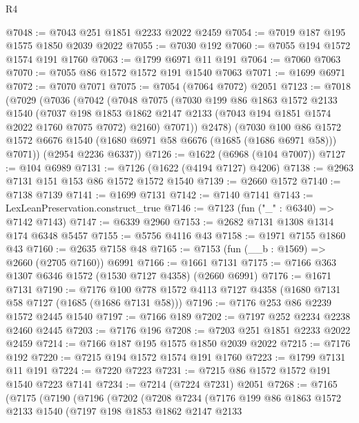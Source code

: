 \begin{lexlean}{R4}
\begin{coremodule}
@7048 := @7043 @251 @1851 @2233 @2022 @2459
@7054 := @7019 @187 @195 @1575 @1850 @2039 @2022
@7055 := @7030 @192
@7060 := @7055 @194 @1572 @1574 @191 @1760
@7063 := @1799 @6971 @11 @191
@7064 := @7060 @7063
@7070 := @7055 @86 @1572 @1572 @191 @1540 @7063
@7071 := @1699 @6971
@7072 := @7070 @7071
@7075 := @7054 (@7064 @7072) @2051
@7123 := @7018
    (@7029
      (@7036
        (@7042
          (@7048
            @7075
            (@7030
              @199
              @86
              @1863
              @1572
              @2133
              @1540
              (@7037
                @198
                @1853
                @1862
                @2147
                @2133
                (@7043 @194 @1851 @1574 @2022 @1760 @7075 @7072)
                @2160)
              @7071))
          @2478)
        (@7030
          @100
          @86
          @1572
          @1572
          @6676
          @1540
          (@1680 @6971 @58 @6676 (@1685 (@1686 @6971 @58)))
          @7071))
      (@2954 @2236 @6337))
@7126 := @1622 (@6968 (@104 @7007))
@7127 := @104 @6989
@7131 := @7126 (@1622 (@4194 @7127) @4206)
@7138 := @2963 @7131 @151 @153 @86 @1572 @1572 @1540
@7139 := @2660 @1572
@7140 := @7138 @7139
@7141 := @1699 @7131
@7142 := @7140 @7141
@7143 := LexLeanPreservation.construct_true
@7146 := @7123 (fun ("_" : @6340) => @7142 @7143)
@7147 := @6339 @2960
@7153 := @2682 @7131 @1308 @1314 @174 @6348 @5457
@7155 := @5756 @4116 @43
@7158 := @1971 @7155 @1860 @43
@7160 := @2635 @7158 @48
@7165 := @7153 (fun (__b : @1569) => @2660 (@2705 @7160)) @6991
@7166 := @1661 @7131
@7175 := @7166 @363 @1307 @6346 @1572 (@1530 @7127 @4358) (@2660 @6991)
@7176 := @1671 @7131
@7190 := @7176 @100 @778 @1572 @4113 @7127 @4358 (@1680 @7131 @58 @7127 (@1685 (@1686 @7131 @58)))
@7196 := @7176 @253 @86 @2239 @1572 @2445 @1540
@7197 := @7166 @189
@7202 := @7197 @252 @2234 @2238 @2460 @2445
@7203 := @7176 @196
@7208 := @7203 @251 @1851 @2233 @2022 @2459
@7214 := @7166 @187 @195 @1575 @1850 @2039 @2022
@7215 := @7176 @192
@7220 := @7215 @194 @1572 @1574 @191 @1760
@7223 := @1799 @7131 @11 @191
@7224 := @7220 @7223
@7231 := @7215 @86 @1572 @1572 @191 @1540 @7223 @7141
@7234 := @7214 (@7224 @7231) @2051
@7268 := @7165
    (@7175
      (@7190
        (@7196
          (@7202
            (@7208
              @7234
              (@7176
                @199
                @86
                @1863
                @1572
                @2133
                @1540
                (@7197
                  @198
                  @1853
                  @1862
                  @2147
                  @2133

\end{coremodule}
\end{lexlean}
